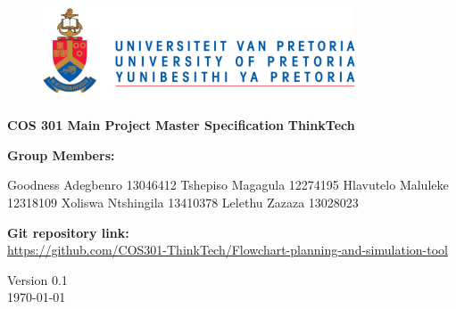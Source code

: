 \begin{titlepage}
	\begin{center}
		
		\begin{figure}[t]
			\centering
			\includegraphics[width=350px]{UP_Logo.png}
		\end{figure}		
	
	
	\begin{flushright} 
		
		\textbf{\LARGE COS 301 Main Project}
		\newline \newline \newline
		\textbf{\LARGE Master Specification}
		\newline \newline \newline
 		\textbf{\LARGE ThinkTech}
		\newline \newline \newline
	\end{flushright}
		
		\vspace{1 cm}
		
		\LARGE{\textbf{Group Members: }}
		

		\begin{flushright} \large			
			Goodness Adegbenro 13046412\newline
			Tshepiso Magagula 12274195\newline
			Hlavutelo Maluleke 12318109\newline			
			Xoliswa Ntshingila 13410378\newline
			Lelethu Zazaza 13028023\newline
		\end{flushright}
		
	
		
		\textbf{Git repository link:\\}
		 \url{https://github.com/COS301-ThinkTech/Flowchart-planning-and-simulation-tool}
		
		\vfill
		
		{\LARGE Version 0.1}
		\\
		{\large \today}		
		
		
	\end{center}
\end{titlepage}
